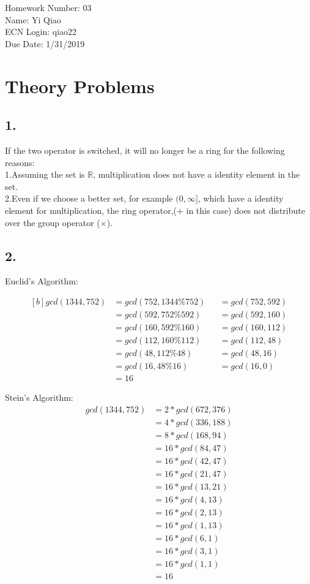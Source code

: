 \documentclass[11pt]{article}
\begin{document}
\noindent Homework Number: 03\\
Name: Yi Qiao\\
ECN Login: qiao22\\
Due Date: 1/31/2019\\
\section*{Theory Problems}
\subsection*{1.} 
If the two operator is switched, it will no longer be a ring for the following reasons:\\
\indent1.Assuming the set is $\mathbb{R}$, multiplication does not have a identity element in the set.\\
\indent2.Even if we choose a better set, for example $(0,\infty]$, which have a identity element for multiplication, the ring operator,($+$ in this case) does not distribute over the group operator ($\times$).

\subsection*{2.}
	Euclid's Algorithm:

	\begin{equation}	
	\begin{aligned}[b]
	gcd(1344,752)&=gcd(752,1344\%752)&	&=gcd(752,592)\\
	&=gcd(592,752\%592)	&	&=gcd(592,160)\\
	&=gcd(160,592\%160)	&	&=gcd(160,112)\\
	&=gcd(112,160\%112)	&	&=gcd(112,48)\\
	&=gcd(48,112\%48)	&	&=gcd(48,16)\\
	&=gcd(16,48\%16)	&	&=gcd(16,0)\\
	&=16
	\end{aligned}
	\end{equation}
	
	Stein's Algorithm:
	\begin{equation}
	\begin{split}
	gcd(1344,752)&=2*gcd(672,376)\\
	&=4*gcd(336,188)\\
	&=8*gcd(168,94)\\
	&=16*gcd(84,47)\\
	&=16*gcd(42,47)\\
	&=16*gcd(21,47)\\
	&=16*gcd(13,21)\\
	&=16*gcd(4,13)\\
	&=16*gcd(2,13)\\
	&=16*gcd(1,13)\\
	&=16*gcd(6,1)\\
	&=16*gcd(3,1)\\
	&=16*gcd(1,1)\\
	&=16
	\end{split}
	\end{equation}
\end{document}
